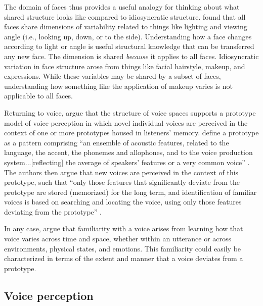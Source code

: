 The domain of faces thus provides a useful analogy for thinking about what shared structure looks like compared to idiosyncratic structure. \citet{burton_2016_faces} found that all faces share dimensions of variability related to things like lighting and viewing angle (i.e., looking up, down, or to the side). Understanding how a face changes according to light or angle is useful structural knowledge that can be transferred any new face. The dimension is shared \textit{because} it applies to all faces. Idiosyncratic variation in face structure arose from things like facial hairstyle, makeup, and expressions. While these variables may be shared by a subset of faces, understanding how something like the application of makeup varies is not applicable to all faces. 

Returning to voice, \citet{lee_2019_acoustic} argue that the structure of voice spaces supports a prototype model of voice perception \citep{lavner_2001_prototype, latinus_2011_voice} in which novel individual voices are perceived in the context of one or more prototypes housed in listeners' memory. \citeauthor{lavner_2001_prototype} define a prototype as a pattern comprising ``an ensemble of acoustic features, related to the language, the accent, the phonemes and allophones, and to the voice production system...[reflecting] the average of speakers’ features or a very common voice'' \citeyearpar[][p. 64]{lavner_2001_prototype}. The authors then argue that new voices are perceived in the context of this prototype, such that ``only those features that significantly deviate from the prototype are stored (memorized) for the long term, and identification of familiar voices is based on searching and locating the voice, using only those features deviating from the prototype'' \citep[][p. 64]{lavner_2001_prototype}.

In any case, \citet{lee_2019_acoustic} argue that familiarity with a voice arises from learning how that voice varies across time and space, whether within an utterance or across environments, physical states, and emotions. This familiarity could easily be characterized in terms of the extent and manner that a voice deviates from a prototype. 

\subsection{Voice perception}\label{ch3:sec:voiceperception}

